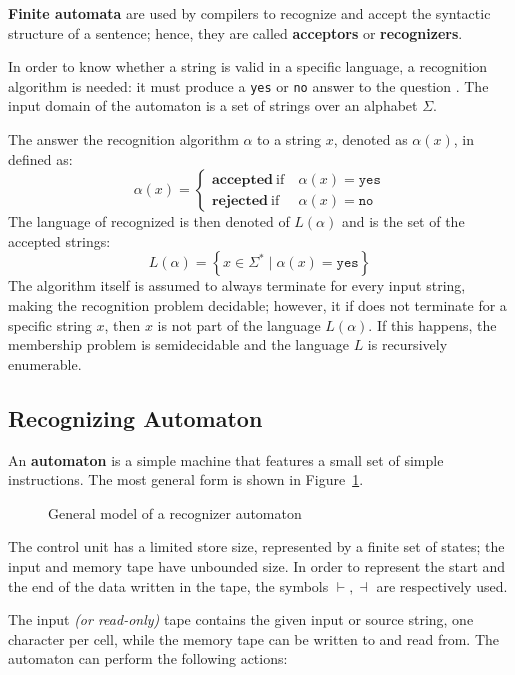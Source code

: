 \documentclass[english]{article}
\begin{document}
\textbf{Finite automata} are used by compilers to recognize and accept the syntactic structure of a sentence;
hence, they are called \textbf{acceptors} or \textbf{recognizers}.

In order to know whether a string is valid in a specific language, a recognition algorithm is needed: it must produce a \texttt{yes} or \texttt{no} answer to the question .
The input domain of the automaton is a set of strings over an alphabet \(\Sigma\).

The answer the recognition algorithm \(\alpha\) to a string \(x\), denoted as \(\alpha(x)\), in defined as:
\[ \alpha(x) = \begin{cases}
    \textbf{accepted} \ \text{if} \  & \alpha(x) = \texttt{yes} \\
    \textbf{rejected} \ \text{if} \  & \alpha(x) = \texttt{no}
  \end{cases}\]
The language of recognized is then denoted of \(L(\alpha)\) and is the set of the accepted strings:
\[ L(\alpha) = \left\{ x \in \Sigma^\ast \mid \alpha(x) = \texttt{yes} \right\}\]
The algorithm itself is assumed to always terminate for every input string, making the recognition problem decidable;
however, it if does not terminate for a specific string \(x\), then \(x\) is not part of the language \(L(\alpha)\).
If this happens, the membership problem is semidecidable and the language \(L\) is recursively enumerable.

\subsection{Recognizing Automaton}
\label{sec:recognizing-automaton}

An \textbf{automaton} is a simple machine that features a small set of simple instructions.
The most general form is shown in Figure~\ref{fig:automaton}.

\begin{figure}[hbtp]
  \centering
  \bigskip
  \caption{General model of a recognizer automaton}
  \label{fig:automaton}
  \bigskip
\end{figure}

The control unit has a limited store size, represented by a finite set of states;
the input and memory tape have unbounded size.
In order to represent the start and the end of the data written in the tape, the symbols \(\vdash, \dashv\) are respectively used.

The input \textit{(or read-only)} tape contains the given input or source string, one character per cell, while the memory tape can be written to and read from.
The automaton can perform the following actions:
\end{document}
